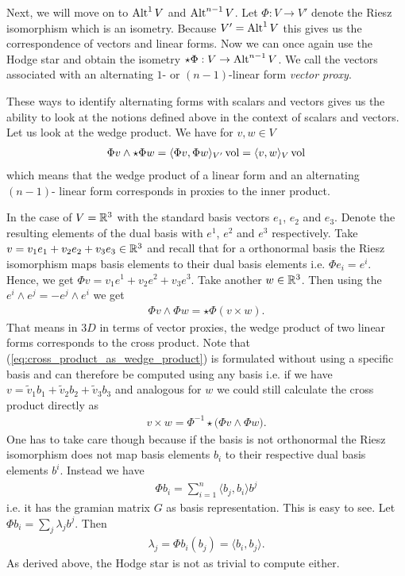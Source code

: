 \documentclass[../master_thesis.tex]{subfiles}
\begin{document}
Next, we will move on to ${\text{Alt}^{1}\,V}$ and ${\text{Alt}^{n-1}\,V}$. 
Let $\Phi: V \rightarrow V'$ denote the Riesz isomorphism which is an isometry.
Because $V' = {\text{Alt}^{1}\,V}$ this gives us the correspondence of 
vectors and linear forms. Now we can once again use the Hodge star and obtain 
the isometry $\star \Phi: V \rightarrow {\text{Alt}^{n-1}\,V}$. We call 
the vectors associated with an alternating $1$- or $(n-1)$-linear form 
\textit{vector proxy}.

These ways to identify alternating forms with scalars and vectors gives us the 
ability to look at the notions defined above in the context of scalars 
and vectors.
Let us look at the wedge product. We have for $v,w \in V$
\begin{align*}
    \Phi v \wedge \star \Phi w = \langle \Phi v , \Phi w \rangle_{V'} \operatorname{vol}
    = \langle v , w \rangle_{V} \operatorname{vol}
\end{align*}
which means that the wedge product of a linear form and an alternating $(n-1)$-
linear form corresponds in proxies to the inner product.

In the case of $V= \mathbb{R}^3$ with the standard basis
vectors $e_1$, $e_2$ and $e_3$. Denote the resulting elements 
of the dual basis with $e^1$, $e^2$ and $e^3$ respectively. 
Take $v = v_1 e_1 + v_2 e_2 + v_3 e_3 \in \mathbb{R}^3$ 
and recall that for a orthonormal basis the Riesz isomorphism maps basis 
elements to their dual basis elements i.e. $\Phi e_i = e^i$. Hence, 
we get $\Phi v = v_1 e^1 + v_2 e^2 + v_3 e^3$. Take another $w \in \mathbb{R}^3$.
Then using the $e^i \wedge e^j = - e^j \wedge e^i$ we get 
\begin{align}
    \Phi v \wedge \Phi w = \star \Phi (v \times w). 
    \label{eq:cross_product_as_wedge_product}
\end{align}
That means in $3D$ in terms of vector proxies, the wedge product 
of two linear forms corresponds to the cross product. Note that 
(\ref{eq:cross_product_as_wedge_product}) is formulated without using a 
specific basis and can therefore be computed using any basis i.e. 
if we have $v = \tilde{v}_1 b_1 + \tilde{v}_2 b_2 + \tilde{v}_3 b_3$ 
and analogous for $w$ we could still calculate the cross product directly as 
\begin{align*}
    v \times w = \Phi^{-1} \star \big(\Phi v \wedge \Phi w \big).
\end{align*}
One has to take care though because if the basis is not orthonormal 
the Riesz isomorphism does not map basis elements $b_i$ to their respective 
dual basis elements $b^i$. Instead we have 
\begin{align*}
    \Phi b_i = \sum_{i=1}^{n} \langle b_j, b_i \rangle b^j
\end{align*}
i.e. it has the gramian matrix $G$ as basis representation. 
This is easy to 
see. Let $\Phi b_i = \sum_j \lambda_j b^j$. Then
\begin{align*}
    \lambda_j = \Phi b_i (b_j) = \langle b_i, b_j \rangle.
\end{align*}
As derived above, the Hodge star is not as trivial to compute either.
\end{document}
